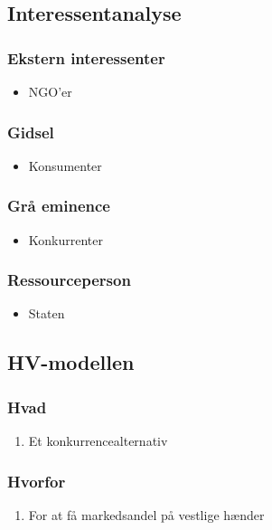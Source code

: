 \documentclass[11pt]{article}
\begin{document}
\subsection{Interessentanalyse}
\label{sec:orgec7817c}
\subsubsection{Ekstern interessenter}
\label{sec:orge1f4b78}
\begin{itemize}
\item NGO'er
\end{itemize}
\subsubsection{Gidsel}
\label{sec:org7adb390}
\begin{itemize}
\item Konsumenter
\end{itemize}
\subsubsection{Grå eminence}
\label{sec:org8716a33}
\begin{itemize}
\item Konkurrenter
\end{itemize}
\subsubsection{Ressourceperson}
\label{sec:org34ba23e}
\begin{itemize}
\item Staten
\end{itemize}
\subsection{HV-modellen}
\label{sec:orga2f59cc}
\subsubsection{Hvad}
\label{sec:org50be78a}
\begin{enumerate}
\item Et konkurrencealternativ
\end{enumerate}
\subsubsection{Hvorfor}
\label{sec:org8c367e1}
\begin{enumerate}
\item For at få markedsandel på vestlige hænder
\end{enumerate}
\end{document}
